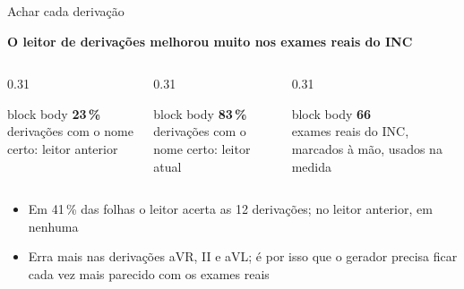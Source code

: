 \documentclass[aspectratio=169,10pt]{beamer}
\newcommand{\mensagem}[1]{{\centering\large\textcolor{incred}{\textbf{#1}}\par}\vspace{0.25cm}}
\newcommand{\numero}[3][incred]{%
  \begin{beamercolorbox}[wd=\linewidth,sep=6pt,center]{block body}
    {\Huge\bfseries\textcolor{#1}{#2}}\\[4pt]
    {\small #3}
  \end{beamercolorbox}}
\begin{document}
\begin{frame}{Achar cada derivação}
  \mensagem{O leitor de derivações melhorou muito nos exames reais do INC}
  \begin{columns}[T]
    \begin{column}{0.31\textwidth}
      \numero[incgray!70]{23\,\%}{derivações com o nome certo: leitor anterior}
    \end{column}
    \begin{column}{0.31\textwidth}
      \numero{83\,\%}{derivações com o nome certo: leitor atual}
    \end{column}
    \begin{column}{0.31\textwidth}
      \numero[incgray!70]{66}{exames reais do INC, marcados à mão, usados na medida}
    \end{column}
  \end{columns}

  \vspace{0.45cm}
  \begin{itemize}
    \item Em 41\,\% das folhas o leitor acerta as 12 derivações; no leitor anterior, em nenhuma
    \item Erra mais nas derivações aVR, II e aVL; é por isso que o gerador precisa ficar cada vez mais parecido com os exames reais
  \end{itemize}
\end{frame}
\end{document}

